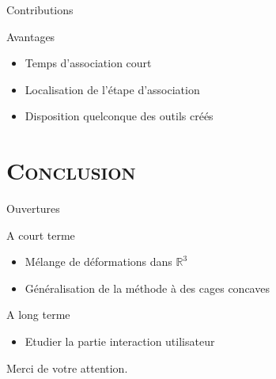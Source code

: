 \documentclass[xcolor=x11names,compress]{beamer}
\renewcommand{\(}{\begin{columns}} \renewcommand{\)}{\end{columns}}
\newcommand{\<}[1]{\begin{column}{#1}} \renewcommand{\>}{\end{column}}
\begin{document}
\begin{frame}{Contributions}
  \begin{exampleblock}{Avantages}
    \begin{itemize}
      \item Temps d'association court
      \item Localisation de l'étape d'association
      \item Disposition quelconque des outils créés
    \end{itemize}
  \end{exampleblock}
\end{frame}


\section{\scshape Conclusion}

\begin{frame}{Ouvertures}
  \begin{block}{A court terme}
    \begin{itemize}
      \item Mélange de déformations dans $\mathbb{R}^3$
      \item Généralisation de la méthode à des cages concaves
    \end{itemize}
  \end{block}
  \begin{block}{A long terme}
    \begin{itemize}
      \item Etudier la partie interaction utilisateur
    \end{itemize}
  \end{block}
\end{frame}

\begin{frame}{}
\begin{center}
\huge Merci de votre attention.
\end{center}
\end{frame}

\appendix
\end{document}
